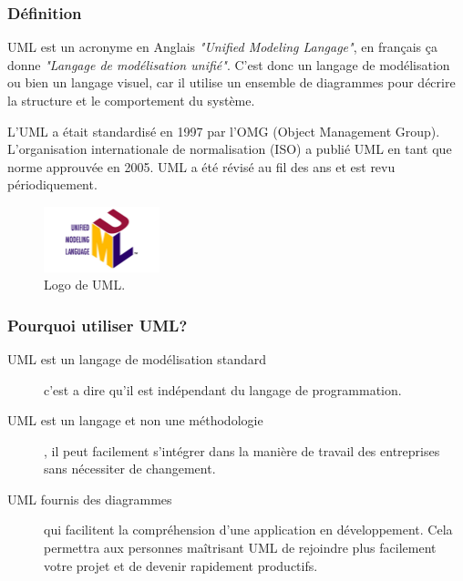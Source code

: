 \documentclass[french]{report}
\begin{document}
        \subsubsection{Définition}
        UML est un acronyme en Anglais \emph{"Unified Modeling Langage"}, en français ça donne 
	\emph{"Langage de modélisation unifié"}. C'est donc un langage de modélisation ou bien
	un langage visuel, car il utilise un ensemble de diagrammes pour décrire la structure 
	et le comportement du système.\cite{geeksforgeeks}
        
        L'UML a était standardisé en 1997 par l'OMG (Object Management Group). L'organisation
	internationale de normalisation (ISO) a publié UML en tant que norme approuvée en 2005.
	UML a été révisé au fil des ans et est revu périodiquement.\cite{geeksforgeeks}
        
        \begin{figure}[!h] 
        \center 
            \includegraphics[width=0.3\textwidth,keepaspectratio]{images/uml-logo-large.jpg} 
            \caption{Logo de UML.}
            \label{UML logo}
        \end{figure}
        
        \subsubsection{Pourquoi utiliser UML?}
        \begin{description}
            \item[UML est un langage de modélisation standard] c'est a dire 
            qu'il est indépendant du langage de programmation. \cite{IBM}
            \item[UML est un langage et non une méthodologie], 
	    il peut facilement s'intégrer dans la manière de travail des entreprises sans nécessiter de changement.\cite{IBM}
            \item[UML fournis des diagrammes] 
	    qui facilitent la compréhension d'une application en développement.
	    Cela permettra aux personnes maîtrisant UML de rejoindre plus facilement
	    votre projet et de devenir rapidement productifs.\cite{IBM}
        \end{description}
        
\end{document}
